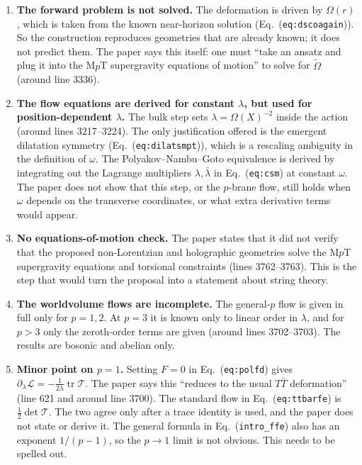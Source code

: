 \documentclass[11pt]{article}
\begin{document}
\begin{enumerate}
\item \textbf{The forward problem is not solved.} The deformation is driven by $\Omega(r)$, which is taken from the known near-horizon solution (Eq.~(\texttt{eq:dscoagain})). So the construction reproduces geometries that are already known; it does not predict them. The paper says this itself: one must ``take an ansatz and plug it into the M$p$T supergravity equations of motion'' to solve for $\tilde\Omega$ (around line 3336).

\item \textbf{The flow equations are derived for constant $\lambda$, but used for position-dependent $\lambda$.} The bulk step sets $\lambda = \Omega(X)^{-2}$ inside the action (around lines 3217--3224). The only justification offered is the emergent dilatation symmetry (Eq.~(\texttt{eq:dilatsmpt})), which is a rescaling ambiguity in the definition of $\omega$. The Polyakov--Nambu--Goto equivalence is derived by integrating out the Lagrange multipliers $\lambda,\bar\lambda$ in Eq.~(\texttt{eq:csm}) at constant $\omega$. The paper does not show that this step, or the $p$-brane flow, still holds when $\omega$ depends on the transverse coordinates, or what extra derivative terms would appear.

\item \textbf{No equations-of-motion check.} The paper states that it did not verify that the proposed non-Lorentzian and holographic geometries solve the M$p$T supergravity equations and torsional constraints (lines 3762--3763). This is the step that would turn the proposal into a statement about string theory.

\item \textbf{The worldvolume flows are incomplete.} The general-$p$ flow is given in full only for $p=1,2$. At $p=3$ it is known only to linear order in $\lambda$, and for $p>3$ only the zeroth-order terms are given (around lines 3702--3703). The results are bosonic and abelian only.

\item \textbf{Minor point on $p=1$.} Setting $F=0$ in Eq.~(\texttt{eq:polfd}) gives $\partial_\lambda\mathcal L=-\tfrac{1}{2\lambda}\operatorname{tr}\mathcal T$. The paper says this ``reduces to the usual $T\bar T$ deformation'' (line 621 and around line 3700). The standard flow in Eq.~(\texttt{eq:ttbarfe}) is $\tfrac12\det\mathcal T$. The two agree only after a trace identity is used, and the paper does not state or derive it. The general formula in Eq.~(\texttt{intro\_ffe}) also has an exponent $1/(p-1)$, so the $p\to1$ limit is not obvious. This needs to be spelled out.
\end{enumerate}
\end{document}
